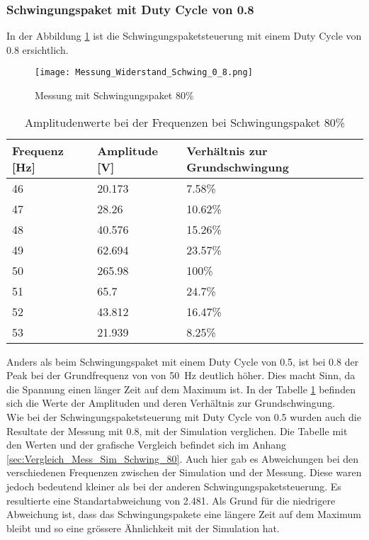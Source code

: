 \newpage
\subsubsection*{Schwingungspaket mit Duty Cycle von 0.8}
In der Abbildung \ref{fig:Mess_Schwing_80} ist die Schwingungspaketsteuerung mit einem Duty Cycle von 0.8 ersichtlich.
\begin{figure}[ht!]
	\centering
	\texttt{[image: Messung\_Widerstand\_Schwing\_0\_8.png]}	
	\caption{Messung mit Schwingungspaket 80\%}\label{fig:Mess_Schwing_80}
\end{figure}


\begin{table}[ht!]
	\centering
	\begin{tabular}{|l|l|l|}
		\hline
		Frequenz {[}Hz{]} & Amplitude {[}V{]} & Verhältnis zur Grundschwingung \\ \hline
		46                & 20.173            & 7.58\%                         \\ \hline
		47                & 28.26             & 10.62\%                        \\ \hline
		48                & 40.576            & 15.26\%                        \\ \hline
		49                & 62.694            & 23.57\%                        \\ \hline
		50                & 265.98            & 100\%                          \\ \hline
		51                & 65.7              & 24.7\%                         \\ \hline
		52                & 43.812            & 16.47\%                        \\ \hline
		53                & 21.939            & 8.25\%                         \\ \hline
	\end{tabular}
\caption{Amplitudenwerte bei der Frequenzen bei Schwingungspaket 80\%}\label{tab:Mess_Spannung_Schwing_80}
\end{table}

Anders als beim Schwingungspaket mit einem Duty Cycle von 0.5, ist bei 0.8 der Peak bei der Grundfrequenz von von \SI{50}{Hz} deutlich höher. Dies macht Sinn, da die Spannung einen länger Zeit auf dem Maximum ist.
In der Tabelle \ref{tab:Mess_Spannung_Schwing_80} befinden sich die Werte der Amplituden und deren Verhältnis zur Grundschwingung.\\
Wie bei der Schwingungspaketsteuerung mit Duty Cycle von 0.5 wurden auch die Resultate der Messung mit 0.8, mit der Simulation verglichen. Die Tabelle mit den Werten und der grafische Vergleich befindet sich im Anhang \ref{sec:Vergleich_Mess_Sim_Schwing_80}. Auch hier gab es Abweichungen bei den verschiedenen Frequenzen zwischen der Simulation und der Messung. Diese waren jedoch bedeutend kleiner als bei der anderen Schwingungspaketsteuerung. Es resultierte eine Standartabweichung von 2.481. Als Grund für die niedrigere Abweichung ist, dass das Schwingungspakete eine längere Zeit auf dem Maximum bleibt und so eine grössere Ähnlichkeit mit der Simulation hat.


